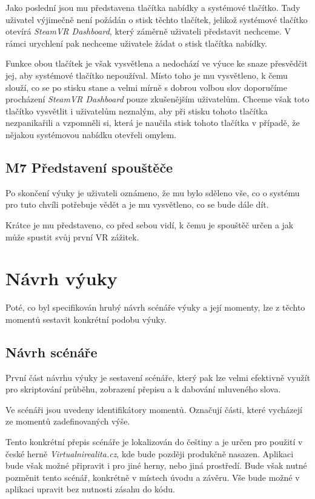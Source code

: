 Jako poslední jsou mu představena tlačítka nabídky a systémové tlačítko.
Tady uživatel výjimečně není požádán o stisk těchto tlačítek, jelikož
systémové tlačítko otevírá \emph{SteamVR Dashboard}, který záměrně
uživateli představit nechceme. V rámci urychlení pak nechceme uživatele
žádat o stisk tlačítka nabídky.

Funkce obou tlačítek je však vysvětlena a nedochází ve výuce ke snaze
přesvědčit jej, aby systémové tlačítko nepoužíval. Místo toho je mu
vysvětleno, k čemu slouží, co se po stisku stane a velmi mírně s dobrou
volbou slov doporučíme procházení \emph{SteamVR Dashboard} pouze
zkušenějším uživatelům. Chceme však toto tlačítko vysvětlit i uživatelům
neznalým, aby při stisku tohoto tlačítka nezpanikařili a vzpomněli si,
která je naučila stisk tohoto tlačítka v případě, že nějakou systémovou
nabídku otevřeli omylem.

\subsection{M7 Představení
spouštěče}\label{m7-pux159edstavenuxed-spouux161tux11bux10de}

Po skončení výuky je uživateli oznámeno, že mu bylo sděleno vše, co o
systému pro tuto chvíli potřebuje vědět a je mu vysvětleno, co se bude
dále dít.

Krátce je mu představeno, co před sebou vidí, k čemu je spouštěč určen a
jak může spustit svůj první VR zážitek.

\section{Návrh výuky}\label{nuxe1vrh-vuxfduky}

Poté, co byl specifikován hrubý návrh scénáře výuky a její momenty, lze
z těchto momentů sestavit konkrétní podobu výuky.

\subsection{Návrh scénáře}\label{nuxe1vrh-scuxe9nuxe1ux159e}

První část návrhu výuky je sestavení scénáře, který pak lze velmi
efektivně využít pro skriptování průběhu, zobrazení přepisu a k dabování
mluveného slova.

Ve scénáři jsou uvedeny identifikátory momentů. Označují části, které
vycházejí ze momentů zadefinovaných výše.

Tento konkrétní přepis scénáře je lokalizován do češtiny a je určen pro
použití v české herně \emph{Virtualnirealita.cz}, kde bude později
produkčně nasazen. Aplikaci bude však možné připravit i pro jiné herny,
nebo jiná prostředí. Bude však nutné pozměnit tento scénář, konkrétně v
místech úvodu a závěru. Vše bude možné v aplikaci upravit bez nutnosti
zásahu do kódu.

